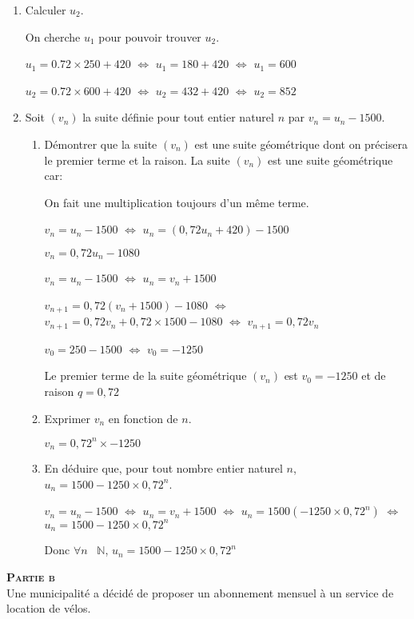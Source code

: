 \documentclass[12pt,a4paper]{article}
\theoremstyle{break}
\begin{document}
	\begin{enumerate}
		\item Calculer $u_2$.\par
		On cherche $u_1$ pour pouvoir trouver $u_2$.\par
		$u_1 = 0.72\times 250+420$ $\Leftrightarrow$ $u_1 = 180+420$ $\Leftrightarrow$ $u_1 = 600$\par
		$u_2 = 0.72\times 600+420$ $\Leftrightarrow$ $u_2 = 432+420$ $\Leftrightarrow$ $u_2 = 852$
		
		\item Soit $\left(v_{n}\right)$  la suite définie pour tout entier naturel $n$ par $v_{n} = u_{n} - 1500$. 
		\begin{enumerate}
			\item Démontrer que la suite $\left(v_{n}\right)$ est une suite géométrique dont on précisera le premier terme et la raison. 
			La suite $\left(v_{n}\right)$ est une suite géométrique car:\par
			On fait une multiplication toujours d'un même terme.\par
			$v_n = u_n -1500 $ $\Leftrightarrow$ $u_n = (0,72u_{n} +420) - 1500$ \par
			$v_n = 0,72u_n-1080$\par
			$v_n = u_n - 1500 $  $\Leftrightarrow$ $u_n = v_n + 1500$\par
			$v_{n+1} = 0,72(v_n+1500)-1080$  $\Leftrightarrow$ $v_{n+1} = 0,72v_n +0,72\times 1500 - 1080$ $\Leftrightarrow$ $v_{n+1} = 0,72v_n$ \par
			$v_0 = 250 - 1500$ $\Leftrightarrow$ $v_0 = -1250$\par
			Le premier terme de la suite géométrique $\left(v_{n}\right)$ est $v_0 = -1250$ et de raison $q = 0,72$\par
			\item Exprimer $v_{n}$ en fonction de $n$.\par
			$v_n = 0,72^n \times -1250$\par
			
			\item En déduire que, pour tout nombre entier naturel $n$, $u_{n} = 1500 -1250\times  0,72^n$.\par
			$v_n = u_n - 1500 $  $\Leftrightarrow$ $u_n = v_n + 1500 $ $\Leftrightarrow$ $ u_n = 1500 (-1250 \times 0,72^n) $ $\Leftrightarrow$ $ u_n = 1500 -1250 \times 0,72^n $  \par
			Donc $\forall n$ \in~$\mathbb{N}$, $ u_n = 1500 -1250 \times 0,72^n $
		\end{enumerate} 
	
	\end{enumerate}
\newpage
		\textsf {\textbf{\textsc{Partie b}}}\\
	Une municipalité a décidé de proposer un abonnement mensuel à un service de location de vélos.
	
\end{document}
